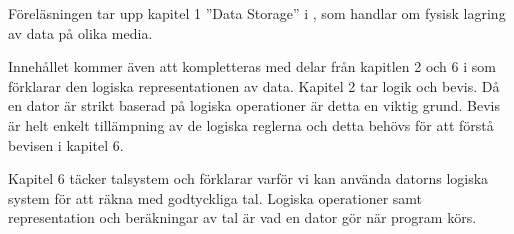 Föreläsningen tar upp kapitel 1 ''Data Storage'' i \citep{Brookshear2012csa}, 
som handlar om fysisk lagring av data på olika media.

Innehållet kommer även att kompletteras med delar från kapitlen 2 och 
6 i \cite{Bosk2011m1c} som förklarar den logiska representationen av data.
Kapitel 2 tar logik och bevis.
Då en dator är strikt baserad på logiska operationer är detta en viktig grund.
Bevis är helt enkelt tillämpning av de logiska reglerna och detta behövs för 
att förstå bevisen i kapitel 6.

Kapitel 6 täcker talsystem och förklarar varför vi kan använda datorns logiska 
system för att räkna med godtyckliga tal.
Logiska operationer samt representation och beräkningar av tal är vad en dator 
gör när program körs.
